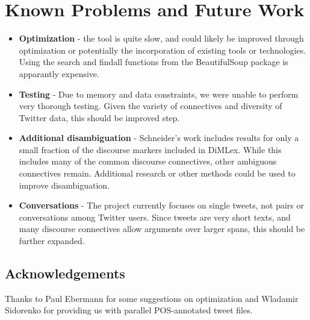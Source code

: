 \documentclass[11pt]{article}
\begin{document}
\section{Known Problems and Future Work}
\begin{itemize}
\item \textbf{Optimization} - the tool is quite slow, and could likely be improved through optimization or potentially the incorporation of existing tools or technologies. Using the search and findall functions from the BeautifulSoup package is apparantly expensive.
\item \textbf{Testing} - Due to memory and data constraints, we were unable to perform very thorough testing.  Given the variety of connectives and diversity of Twitter data, this should be improved step.
\item \textbf{Additional disambiguation} - Schneider's work includes results for only a small fraction of the discourse markers included in DiMLex.  While this includes many of the common discourse connectives, other ambiguous connectives remain.  Additional research or other methods could be used to improve disambiguation.
\item \textbf{Conversations} - The project currently focuses on single tweets, not pairs or conversations among Twitter users.  Since tweets are very short texts, and many discourse connectives allow arguments over larger spans, this should be further expanded.

\end{itemize}

\subsection*{Acknowledgements}

Thanks to Paul Ebermann for some suggestions on optimization and Wladamir Sidorenko for providing us with parallel POS-annotated tweet files.
\end{document}
